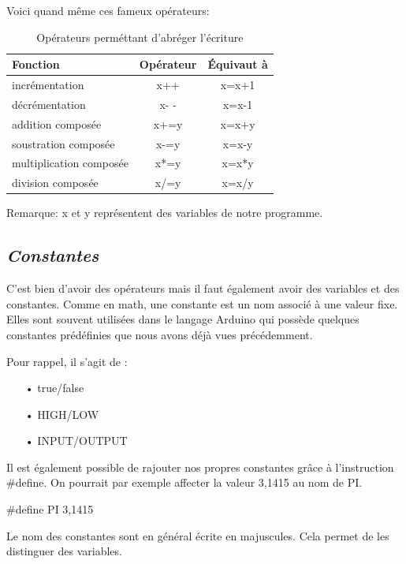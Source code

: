\documentclass[12pt,a4paper]{article}
\begin{document}
\bigskip
Voici quand même ces fameux opérateurs: 
\begin{table}[h!]
\centering
\begin{tabular}{@{}lcc@{}}
\toprule
Fonction & Opérateur & Équivaut à \\ \midrule
incrémentation & x++ & x=x+1 \\
décrémentation & x- - & x=x-1 \\
addition composée & x+=y & x=x+y \\
soustration composée & x-=y & x=x-y \\
multiplication composée & x*=y & x=x*y \\ 
division composée & x/=y & x=x/y \\ 
\end{tabular}
\caption{Opérateurs perméttant d'abréger l'écriture}
\label{my-label}
\end{table}

Remarque: x et y représentent des variables de notre programme.

\bigskip
\subsection{\textit{\textbf{Constantes}}}
C’est bien d’avoir des opérateurs mais il faut également avoir des variables et des constantes. Comme en math, une constante est un nom associé à une valeur fixe. Elles sont souvent utilisées dans le langage Arduino qui possède quelques constantes prédéfinies que nous avons déjà vues précédemment. 

\newpage
Pour rappel, il s’agit de : 

\begin{itemize}
\bigskip
   \item[•] true/false 
   \item[•] HIGH/LOW 
   \item[•] INPUT/OUTPUT
\end{itemize}

\bigskip
Il est également possible de rajouter nos propres constantes grâce à l’instruction \#define. On pourrait par exemple affecter la valeur 3,1415 au nom de PI.

\begin{center}
 \#define PI 3,1415   
\end{center}

\bigskip
Le nom des constantes sont en général écrite en majuscules. Cela permet de les distinguer des variables.
\bigskip
 
\end{document}
